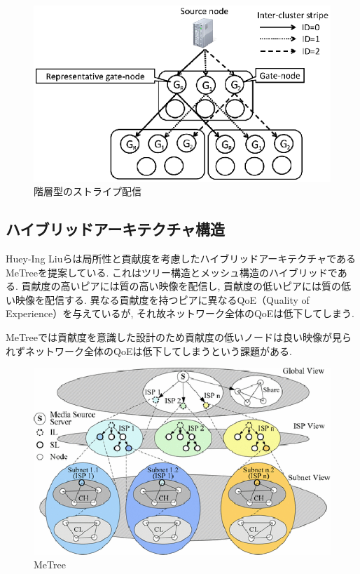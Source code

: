 \documentclass[letter]{ieicej}
\begin{document}
\begin{figure}[h]
  \begin{center}
    \includegraphics{fig2.eps}
  \end{center}
  \caption{階層型のストライプ配信}
  \label{fig:fig02}
\end{figure}

\subsection{ハイブリッドアーキテクチャ構造}
Huey-Ing Liuらは局所性と貢献度を考慮したハイブリッドアーキテクチャであるMeTree\cite{metree}を提案している. これはツリー構造とメッシュ構造のハイブリッドである. 貢献度の高いピアには質の高い映像を配信し, 貢献度の低いピアには質の低い映像を配信する. 異なる貢献度を持つピアに異なるQoE（Quality of Experience）を与えているが, それ故ネットワーク全体のQoEは低下してしまう.

MeTreeでは貢献度を意識した設計のため貢献度の低いノードは良い映像が見られずネットワーク全体のQoEは低下してしまうという課題がある.

\begin{figure}[h]
  \begin{center}
    \includegraphics{fig3.eps}
  \end{center}
  \caption{MeTree}
  \label{fig:fig03}
\end{figure}
\end{document}
